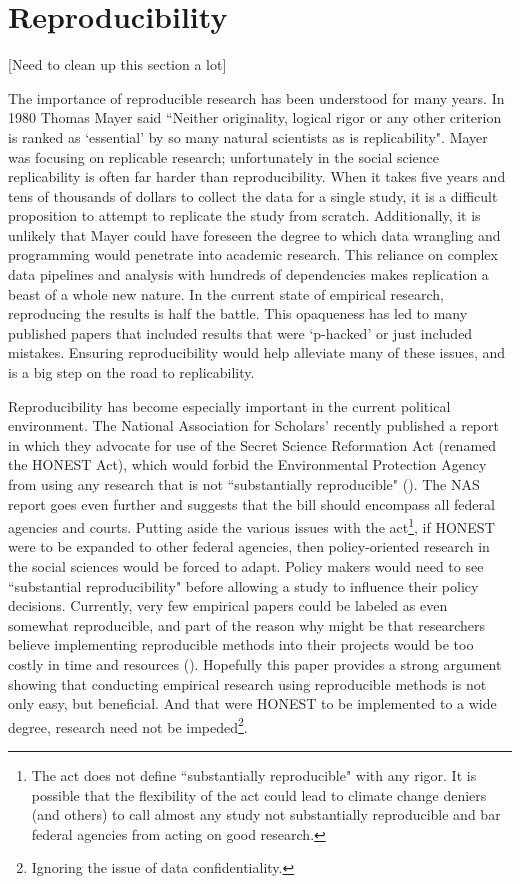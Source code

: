 \documentclass[12pt]{article}
\begin{document}
\section{Reproducibility}
\textcolor{BrickRed}{[Need to clean up this section a lot]}

The importance of reproducible research has been understood for many years. In 1980 Thomas Mayer said ``Neither originality, logical rigor or any other criterion is ranked as `essential' by so many natural scientists as is replicability". Mayer was focusing on replicable research; unfortunately in the social science replicability is often far harder than reproducibility. When it takes five years and tens of thousands of dollars to collect the data for a single study, it is a difficult proposition to attempt to replicate the study from scratch. Additionally, it is unlikely that Mayer could have foreseen the degree to which data wrangling and programming would penetrate into academic research. This reliance on complex data pipelines and analysis with hundreds of dependencies makes replication a beast of a whole new nature. In the current state of empirical research, reproducing the results is half the battle. This opaqueness has led to many published papers that included results that were `p-hacked' or just included mistakes. Ensuring reproducibility would help alleviate many of these issues, and is a big step on the road to replicability.

Reproducibility has become especially important in the current political environment. The National Association for Scholars' recently published a report in which they advocate for use of the Secret Science Reformation Act (renamed the HONEST Act), which would forbid the Environmental Protection Agency from using any research that is not ``substantially reproducible" (\cite{wired}). The NAS report goes even further and suggests that the bill should encompass all federal agencies and courts. Putting aside the various issues with the act\footnote{The act does not define ``substantially reproducible" with any rigor. It is possible that the flexibility of the act could lead to climate change deniers (and others) to call almost any study not substantially reproducible and bar federal agencies from acting on good research.}, if HONEST were to be expanded to other federal agencies, then policy-oriented research in the social sciences would be forced to adapt. Policy makers would need to see ``substantial reproducibility" before allowing a study to influence their policy decisions. Currently, very few empirical papers could be labeled as even somewhat reproducible, and part of the reason why might be that researchers believe implementing reproducible methods into their projects would be too costly in time and resources (\cite{irreproducible}). Hopefully this paper provides a strong argument showing that conducting empirical research using reproducible methods is not only easy, but beneficial. And that were HONEST to be implemented to a wide degree, research need not be impeded\footnote{Ignoring the issue of data confidentiality.}.
\end{document}
